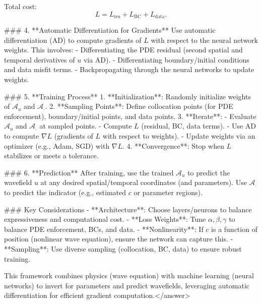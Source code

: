 Total cost:  
\[
L = L_{\text{res}} + L_{\text{BC}} + L_{\text{data}}.
\]  


### 4. **Automatic Differentiation for Gradients**  
Use automatic differentiation (AD) to compute gradients of \( L \) with respect to the neural network weights. This involves:  
- Differentiating the PDE residual (second spatial and temporal derivatives of \( u \) via AD).  
- Differentiating boundary/initial conditions and data misfit terms.  
- Backpropagating through the neural networks to update weights.  


### 5. **Training Process**  
1. **Initialization**: Randomly initialize weights of \( \mathcal{A}_u \) and \( \mathcal{A}_\cdot \).  
2. **Sampling Points**: Define collocation points (for PDE enforcement), boundary/initial points, and data points.  
3. **Iterate**:  
   - Evaluate \( \mathcal{A}_u \) and \( \mathcal{A}_\cdot \) at sampled points.  
   - Compute \( L \) (residual, BC, data terms).  
   - Use AD to compute \( \nabla L \) (gradients of \( L \) with respect to weights).  
   - Update weights via an optimizer (e.g., Adam, SGD) with \( \nabla L \).  
4. **Convergence**: Stop when \( L \) stabilizes or meets a tolerance.  


### 6. **Prediction**  
After training, use the trained \( \mathcal{A}_u \) to predict the wavefield \( u \) at any desired spatial/temporal coordinates (and parameters). Use \( \mathcal{A}_\cdot \) to predict the indicator (e.g., estimated \( c \) or parameter regions).  


### Key Considerations  
- **Architecture**: Choose layers/neurons to balance expressiveness and computational cost.  
- **Loss Weights**: Tune \( \alpha, \beta, \gamma \) to balance PDE enforcement, BCs, and data.  
- **Nonlinearity**: If \( c \) is a function of position (nonlinear wave equation), ensure the network can capture this.  
- **Sampling**: Use diverse sampling (collocation, BC, data) to ensure robust training.  


This framework combines physics (wave equation) with machine learning (neural networks) to invert for parameters and predict wavefields, leveraging automatic differentiation for efficient gradient computation.</answer>